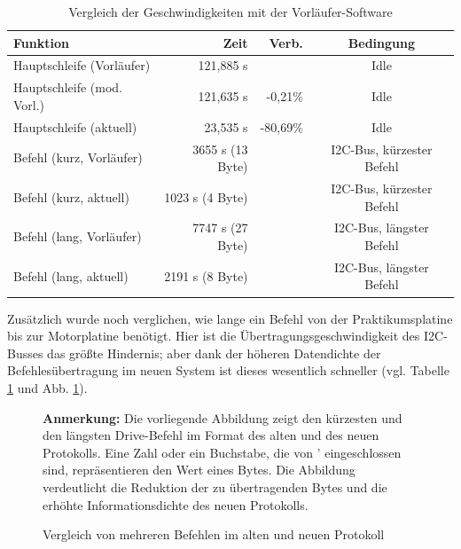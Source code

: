 \begin{table}[htb]
\begin{center}
	\begin{tabular}{|l||r|r|c|}
		\hline
		\textbf{Funktion} & \textbf{Zeit} & \textbf{Verb.} & \textbf{Bedingung} \\ \hline \hline
		Hauptschleife (Vorläufer) & 121,885 \textmu{}s & & Idle \\ \hline
		Hauptschleife (mod. Vorl.) & 121,635 \textmu{}s & -0,21\% & Idle \\ \hline
		Hauptschleife (aktuell) & 23,535 \textmu{}s & -80,69\% & Idle \\ \hline \hline
		Befehl (kurz, Vorläufer) & 3655 \textmu{}s (13 Byte) & & I2C-Bus, kürzester Befehl \\ \hline
		Befehl (kurz, aktuell) & 1023 \textmu{}s (4 Byte) & & I2C-Bus, kürzester Befehl \\ \hline
		Befehl (lang, Vorläufer) & 7747 \textmu{}s (27 Byte) & & I2C-Bus, längster Befehl \\ \hline
		Befehl (lang, aktuell) & 2191 \textmu{}s (8 Byte) & & I2C-Bus, längster Befehl \\ \hline
	\end{tabular}
	\caption{\label{vergl_speed} Vergleich der Geschwindigkeiten mit der Vorläufer-Software}
\end{center}
\end{table}
Zusätzlich wurde noch verglichen, wie lange ein Befehl von der Praktikumsplatine bis zur Motorplatine benötigt.
Hier ist die Übertragungsgeschwindigkeit des I2C-Busses das größte Hindernis; aber dank der höheren Datendichte
der Befehlesübertragung im neuen System ist dieses wesentlich schneller (vgl. Tabelle \ref{vergl_speed} und Abb.
 \ref{vergl_befehle}).
\begin{figure}[htb]
\begin{center}
 \caption{\label{vergl_befehle}Vergleich von mehreren Befehlen im alten und neuen Protokoll}
\end{center}
\textbf{Anmerkung:} Die vorliegende Abbildung zeigt den kürzesten und den längsten
Drive-Befehl im Format des alten und des neuen Protokolls. Eine Zahl oder ein Buchstabe, die von ' eingeschlossen sind,
repräsentieren den Wert eines Bytes. Die Abbildung verdeutlicht die Reduktion der zu übertragenden Bytes
und die erhöhte Informationsdichte des neuen Protokolls.
\end{figure}
